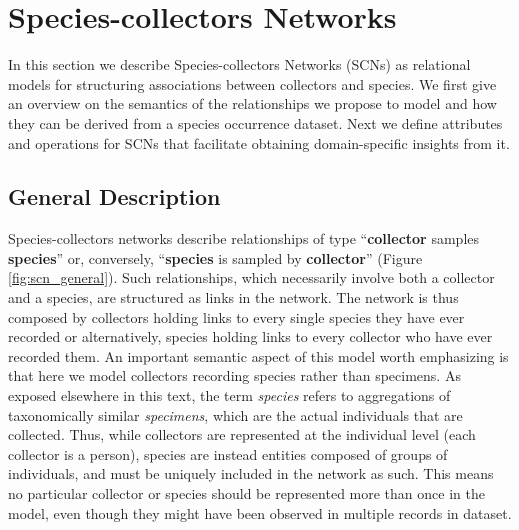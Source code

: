
\section{Species-collectors Networks}

In this section we describe Species-collectors Networks (SCNs) as relational models for structuring associations between collectors and species.
We first give an overview on the semantics of the relationships we propose to model and how they can be derived from a species occurrence dataset.
Next we define attributes and operations for SCNs that facilitate obtaining domain-specific insights from it.

\subsection{General Description}
Species-collectors networks describe relationships of type ``\textbf{collector} samples \textbf{species}'' or, conversely, ``\textbf{species} is sampled by \textbf{collector}'' (Figure \ref{fig:scn_general}). Such relationships, which necessarily involve both a collector and a species, are structured as links in the network.
The network is thus composed by collectors holding links to every single species they have ever recorded or alternatively, species holding links to every collector who have ever recorded them.
An important semantic aspect of this model worth emphasizing is that here we model collectors recording species rather than specimens. As exposed elsewhere in this text, the term \textit{species} refers to aggregations of taxonomically similar \textit{specimens}, which are the actual individuals that are collected. Thus, while collectors are represented at the individual level (each collector is a person), species are instead entities composed of groups of individuals, and must be uniquely included in the network as such.
This means no particular collector or species should be represented more than once in the model, even though they might have been observed in multiple records in dataset.

